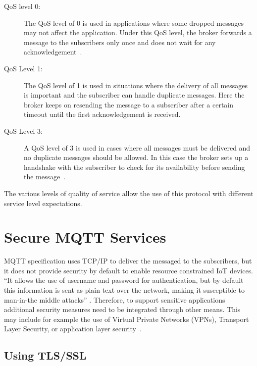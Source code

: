 \begin{description}

\item[QoS level 0:] The QoS level of 0 is used in applications where
  some dropped messages may not affect the application. Under this QoS
  level, the broker forwards a message to the subscribers only once
  and does not wait for any
  acknowledgement~\cite{hivemq-qos}\cite{python-paho-mqtt}.

\item[QoS Level 1:] The QoS level of 1 is used in situations where the
  delivery of all messages is important and the subscriber can handle
  duplicate messages. Here the broker keeps on resending the message
  to a subscriber after a certain timeout until the first
  acknowledgement is received.

\item[QoS Level 3:] A QoS level of 3 is used in cases where all
  messages must be delivered and no duplicate messages should be
  allowed. In this case the broker sets up a handshake with the
  subscriber to check for its availability before sending the
  message~\cite{hivemq-qos,python-paho-mqtt}.

\end{description}

The various levels of quality of service allow the use of this
protocol with different service level expectations.

\section{Secure MQTT Services}

MQTT specification uses TCP/IP to deliver the messaged to the
subscribers, but it does not provide security by default to enable
resource constrained IoT devices. ``It allows the use of username and
password for authentication, but by default this information is sent
as plain text over the network, making it susceptible to man-in-the
middle attacks''
\cite{iot-design-mqtt-security,mqtt-sec-ssl}. Therefore, to support
sensitive applications additional security measures need to be
integrated through other means. This may include for example the use
of Virtual Private Networks (VPNs), Transport Layer Security, or
application layer security~\cite{mqtt-sec-ssl}.

\subsection{Using TLS/SSL}

